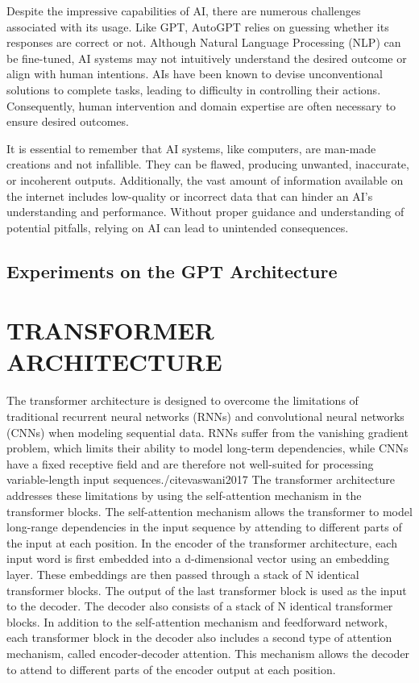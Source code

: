 \documentclass[letterpaper, 10pt, conference]{ieeeconf}
\begin{document}
        Despite the impressive capabilities of AI, there are numerous challenges associated with its usage. Like GPT, AutoGPT relies on guessing whether its responses are correct or not. Although Natural Language Processing (NLP) can be fine-tuned, AI systems may not intuitively understand the desired outcome or align with human intentions. AIs have been known to devise unconventional solutions to complete tasks, leading to difficulty in controlling their actions. Consequently, human intervention and domain expertise are often necessary to ensure desired outcomes\cite{miles2022}.
        
        It is essential to remember that AI systems, like computers, are man-made creations and not infallible. They can be flawed, producing unwanted, inaccurate, or incoherent outputs. Additionally, the vast amount of information available on the internet includes low-quality or incorrect data that can hinder an AI's understanding and performance. Without proper guidance and understanding of potential pitfalls, relying on AI can lead to unintended consequences.

    \subsection{Experiments on the GPT Architecture}
        

    \section{TRANSFORMER ARCHITECTURE}

    The transformer architecture is designed to overcome the limitations of traditional recurrent neural networks (RNNs) and
    convolutional neural networks (CNNs) when modeling sequential data. RNNs suffer from the vanishing gradient problem, which
    limits their ability to model long-term dependencies, while CNNs have a fixed receptive field and are therefore not well-suited for
    processing variable-length input sequences./cite{vaswani2017}
    The transformer architecture addresses these limitations by using the self-attention mechanism in the transformer blocks.
    The self-attention mechanism allows the transformer to model long-range dependencies in the input sequence by attending to
    different parts of the input at each position.
    In the encoder of the transformer architecture, each input word is first embedded into a d-dimensional vector using an
    embedding layer. These embeddings are then passed through a stack of N identical transformer blocks. The output of the last
    transformer block is used as the input to the decoder.
    The decoder also consists of a stack of N identical transformer blocks. In addition to the self-attention mechanism and
    feedforward network, each transformer block in the decoder also includes a second type of attention mechanism, called encoder-decoder attention. This mechanism allows the decoder to attend to different parts of the encoder output at each position.
       
\end{document}
